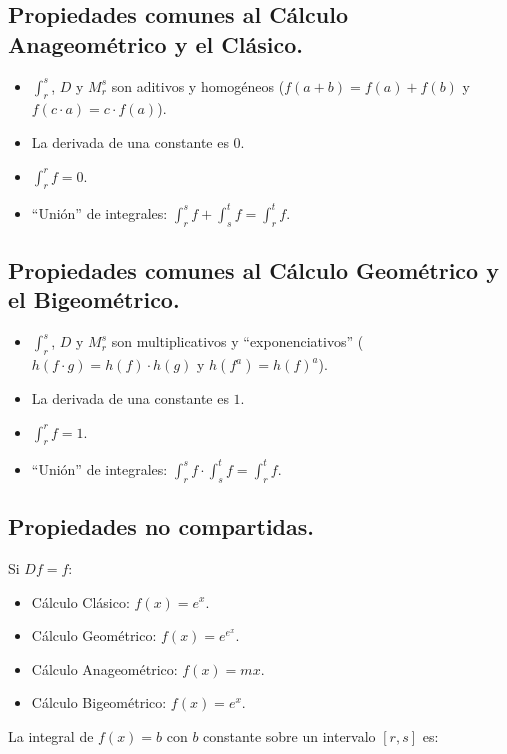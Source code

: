 \newpage

\subsection{Propiedades comunes al Cálculo Anageométrico y el Clásico.}

\begin{itemize}	
	\item $\int_r^s$, $D$ y $M_r^s$ son aditivos y homogéneos ($f(a + b) = f(a) + f(b)$ y $f(c\cdot a) = c\cdot f(a)$).
	\item La derivada de una constante es $0$.
	\item $\int_r^r f = 0$.
	\item \enquote{Unión} de integrales: $\int_r^s f + \int_s^t f = \int_r^t f$.
\end{itemize}

\subsection{Propiedades comunes al Cálculo Geométrico y el Bigeométrico.}

\begin{itemize}
	\item $\int_r^s$, $D$ y $M_r^s$ son multiplicativos y \enquote{exponenciativos} ($h(f\cdot g) = h(f)\cdot h(g)$ y $h(f^a) = h(f)^a$).
	\item La derivada de una constante es $1$.
	\item $\int_r^r f = 1$.
	\item \enquote{Unión} de integrales: $\int_r^s f \cdot \int_s^t f = \int_r^t f$.
\end{itemize}

\subsection{Propiedades no compartidas.}

Si $Df = f$:

\begin{itemize}
	\item Cálculo Clásico: $f(x) = e^x$.
	\item Cálculo Geométrico: $f(x) = e^{e^x}$.
	\item Cálculo Anageométrico: $f(x) = mx$.
	\item Cálculo Bigeométrico: $f(x) = e^x$.
\end{itemize}

La integral de $f(x) = b$ con $b$ constante sobre un intervalo $[r, s]$ es:

